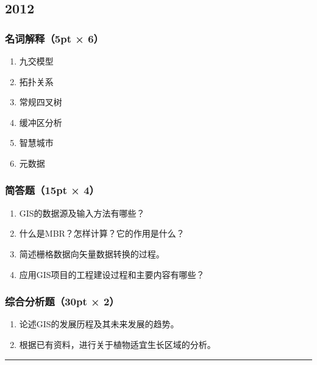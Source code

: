 \documentclass[]{article}
\begin{document}
\hypertarget{header-n426}{%
\subsection{2012}\label{header-n426}}

\hypertarget{header-n427}{%
\subsubsection{名词解释（5pt × 6）}\label{header-n427}}

\begin{enumerate}
\def\labelenumi{\arabic{enumi}.}
\item
  九交模型
\item
  拓扑关系
\item
  常规四叉树
\item
  缓冲区分析
\item
  智慧城市
\item
  元数据
\end{enumerate}

\hypertarget{header-n441}{%
\subsubsection{简答题（15pt × 4）}\label{header-n441}}

\begin{enumerate}
\def\labelenumi{\arabic{enumi}.}
\item
  GIS的数据源及输入方法有哪些？
\item
  什么是MBR？怎样计算？它的作用是什么？
\item
  简述栅格数据向矢量数据转换的过程。
\item
  应用GIS项目的工程建设过程和主要内容有哪些？
\end{enumerate}

\hypertarget{header-n451}{%
\subsubsection{综合分析题（30pt × 2）}\label{header-n451}}

\begin{enumerate}
\def\labelenumi{\arabic{enumi}.}
\item
  论述GIS的发展历程及其未来发展的趋势。
\item
  根据已有资料，进行关于植物适宜生长区域的分析。
\end{enumerate}

\begin{center}\rule{0.5\linewidth}{\linethickness}\end{center}
\end{document}
